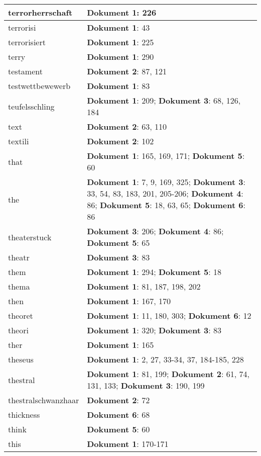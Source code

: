 \documentclass[a5paper]{article}
\begin{document}
\begin{longtable}[l]{|l|p{3in}|}
\hline
terrorherrschaft & \textbf{Dokument 1}: 226 \\
\hline
terrorisi & \textbf{Dokument 1}: 43 \\
\hline
terrorisiert & \textbf{Dokument 1}: 225 \\
\hline
terry & \textbf{Dokument 1}: 290 \\
\hline
testament & \textbf{Dokument 2}: 87, 121 \\
\hline
testwettbewewerb & \textbf{Dokument 1}: 83 \\
\hline
teufelsschling & \textbf{Dokument 1}: 209; \textbf{Dokument 3}: 68, 126, 184 \\
\hline
text & \textbf{Dokument 2}: 63, 110 \\
\hline
textili & \textbf{Dokument 2}: 102 \\
\hline
that & \textbf{Dokument 1}: 165, 169, 171; \textbf{Dokument 5}: 60 \\
\hline
the & \textbf{Dokument 1}: 7, 9, 169, 325; \textbf{Dokument 3}: 33, 54, 83, 183, 201, 205-206; \textbf{Dokument 4}: 86; \textbf{Dokument 5}: 18, 63, 65; \textbf{Dokument 6}: 86 \\
\hline
theaterstuck & \textbf{Dokument 3}: 206; \textbf{Dokument 4}: 86; \textbf{Dokument 5}: 65 \\
\hline
theatr & \textbf{Dokument 3}: 83 \\
\hline
them & \textbf{Dokument 1}: 294; \textbf{Dokument 5}: 18 \\
\hline
thema & \textbf{Dokument 1}: 81, 187, 198, 202 \\
\hline
then & \textbf{Dokument 1}: 167, 170 \\
\hline
theoret & \textbf{Dokument 1}: 11, 180, 303; \textbf{Dokument 6}: 12 \\
\hline
theori & \textbf{Dokument 1}: 320; \textbf{Dokument 3}: 83 \\
\hline
ther & \textbf{Dokument 1}: 165 \\
\hline
theseus & \textbf{Dokument 1}: 2, 27, 33-34, 37, 184-185, 228 \\
\hline
thestral & \textbf{Dokument 1}: 81, 199; \textbf{Dokument 2}: 61, 74, 131, 133; \textbf{Dokument 3}: 190, 199 \\
\hline
thestralschwanzhaar & \textbf{Dokument 2}: 72 \\
\hline
thickness & \textbf{Dokument 6}: 68 \\
\hline
think & \textbf{Dokument 5}: 60 \\
\hline
this & \textbf{Dokument 1}: 170-171 \\

\end{longtable}
\end{document}
